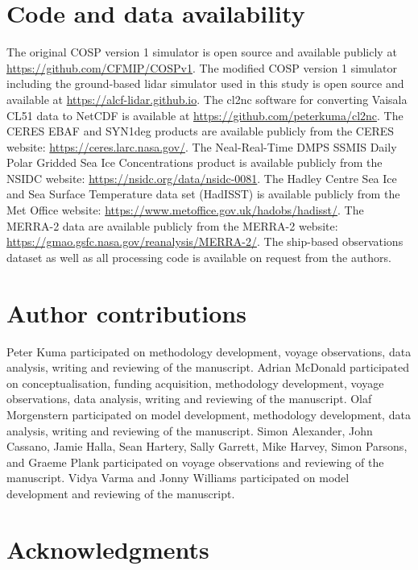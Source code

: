 \section*{Code and data availability}

The original COSP version 1 simulator is open source and available publicly at
\url{https://github.com/CFMIP/COSPv1}. The modified COSP version 1 simulator
including the ground-based lidar simulator used in this study is open source and
available at \url{https://alcf-lidar.github.io}. The cl2nc
software for converting Vaisala CL51 data to NetCDF is available at
\url{https://github.com/peterkuma/cl2nc}. The CERES EBAF and SYN1deg products
are available publicly from the CERES website:
\url{https://ceres.larc.nasa.gov/}. The Neal-Real-Time DMPS SSMIS Daily Polar
Gridded Sea Ice Concentrations product is available publicly from the NSIDC
website: \url{https://nsidc.org/data/nsidc-0081}. The Hadley Centre Sea Ice and
Sea Surface Temperature data set (HadISST) is available publicly from the Met
Office website: \url{https://www.metoffice.gov.uk/hadobs/hadisst/}. The MERRA-2
data are available publicly from the MERRA-2 website:
\url{https://gmao.gsfc.nasa.gov/reanalysis/MERRA-2/}. The ship-based
observations dataset as well as all processing code is available on request
from the authors.

\section*{Author contributions}

Peter Kuma participated on methodology development, voyage observations, data
analysis, writing and reviewing of the manuscript. Adrian McDonald participated
on conceptualisation, funding acquisition, methodology development, voyage
observations, data analysis, writing and reviewing of the manuscript. Olaf
Morgenstern participated on model development, methodology development, data
analysis, writing and reviewing of the manuscript. Simon Alexander, John
Cassano, Jamie Halla, Sean Hartery, Sally Garrett, Mike Harvey, Simon Parsons,
and Graeme Plank participated on voyage observations and reviewing of the
manuscript. Vidya Varma and Jonny Williams participated on model development
and reviewing of the manuscript.

\section*{Acknowledgments}

